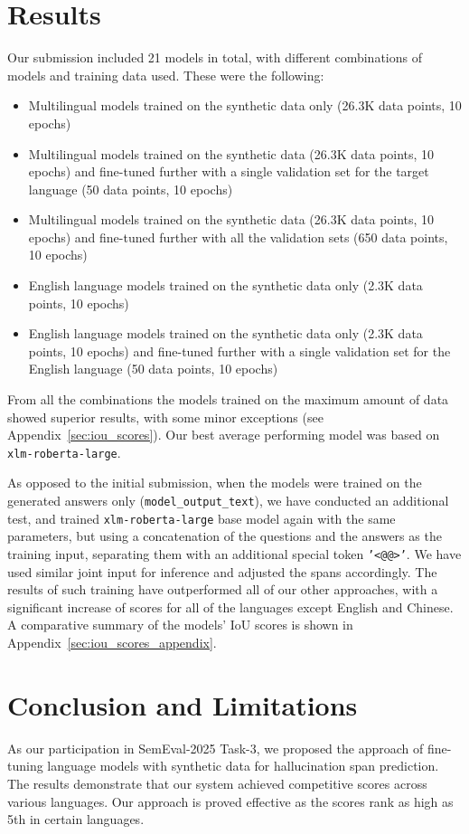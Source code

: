 \documentclass[11pt]{article}
\begin{document}
\section{Results}
Our submission included 21 models in total, with different combinations of models and training data used. These were the following:
\begin{itemize}
    \item Multilingual models trained on the synthetic data only (26.3K data points, 10 epochs)
    \item Multilingual models trained on the synthetic data (26.3K data points, 10 epochs) and fine-tuned further with a single validation set for the target language (50 data points, 10 epochs)
    \item Multilingual models trained on the synthetic data (26.3K data points, 10 epochs) and fine-tuned further with all the validation sets (650 data points, 10 epochs)
    \item English language models trained on the synthetic data only (2.3K data points, 10 epochs)
    \item English language models trained on the synthetic data only (2.3K data points, 10 epochs) and fine-tuned further with a single validation set for the English language (50 data points, 10 epochs)
\end{itemize}

From all the combinations the models trained on the maximum amount of data showed superior results, with some minor exceptions (see Appendix~\ref{sec:iou_scores}). Our best average performing model was based on \texttt{xlm-roberta-large}.

As opposed to the initial submission, when the models were trained on the generated answers only (\texttt{model\_output\_text}), we have conducted an additional test, and trained \texttt{xlm-roberta-large} base model again with the same parameters, but using a concatenation of the questions and the answers as the training input, separating them with an additional special token \texttt{'<@@>'}. We have used similar joint input for inference and adjusted the spans accordingly. The results of such training have outperformed all of our other approaches, with a significant increase of scores for all of the languages except English and Chinese. A comparative summary of the models' IoU scores is shown in Appendix~\ref{sec:iou_scores_appendix}.

\section{Conclusion and Limitations}
As our participation in SemEval-2025 Task-3, we proposed the approach of fine-tuning language models with synthetic data for hallucination span prediction. The results demonstrate that our system achieved competitive scores across various languages. Our approach is proved effective as the scores rank as high as 5th in certain languages.
\end{document}
